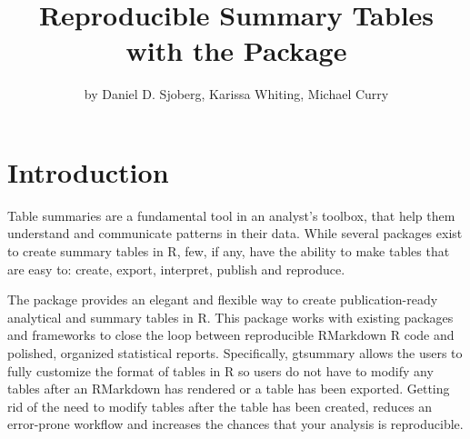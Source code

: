 \title{Reproducible Summary Tables with the  Package}
\author{by Daniel D. Sjoberg, Karissa Whiting, Michael Curry}

\maketitle



\section{Introduction}

Table summaries are a fundamental tool in an analyst's toolbox, that help them understand and communicate patterns in their data.
While several packages exist to create summary tables in R, few, if any, have the ability to make tables that are easy to: create, export, interpret, publish and reproduce. 

The  \citep{gtsummary} package provides an elegant and flexible way to create publication-ready analytical and summary tables in R.
This package works with existing packages and frameworks to close the loop between reproducible RMarkdown R code and polished, organized statistical reports.
Specifically, gtsummary allows the users to fully customize the format of tables in R so users do not have to modify any tables after an RMarkdown has rendered or a table has been exported.
Getting rid of the need to modify tables after the table has been created, reduces an error-prone workflow and increases the chances that your analysis is reproducible. 


